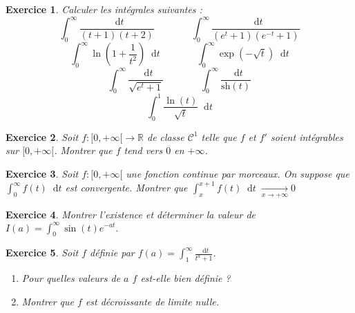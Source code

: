\documentclass[a4paper,12pt,twocolumn]{article}
\theoremstyle{break}
\theoremstyle{sc}
\newtheorem{exo}{Exercice}
\theoremstyle{definition}
\theoremstyle{remark}
\newcommand{\diff}{\mathop{}\!\mathrm{d}}
\begin{document}
\begin{exo}
  Calculer les intégrales suivantes :
  \[
    \int_0^\infty \frac{\diff
    t}{(t+1)(t+2)}\phantom{ainsi que}\int_0^\infty\frac{\diff t}{(e^t+1)(e^{-t}+1)}
  \]
  \[
    \int_0^\infty\ln(1+\frac{1}{t^2})\diff t\phantom{ainsi
    que}\int_0^\infty\exp(-\sqrt t)\diff t
  \]
  \[
    \int_0^\infty \frac{\diff t}{\sqrt{e^t+1}}\phantom{ainsi
    que}\int_0^\infty\frac{\diff t}{\mathrm{sh}(t)}
  \]
  \[
    \int_0^1\frac{\ln(t)}{\sqrt t}\diff t
  \]
\end{exo}

\begin{exo}
  Soit $f:[0,+\infty[\rightarrow\mathbb{R}$ de classe $\mathcal C^1$
    telle que $f$ et $f'$ soient intégrables sur $[0,+\infty[$. Montrer
      que $f$ tend vers $0$ en $+\infty$.
\end{exo}

\begin{exo}
  Soit $f:[0,+\infty[$ une fonction continue par morceaux. On suppose
    que $\int_0^\infty f(t)\diff t$ est convergente. Montrer que
    $\int_x^{x+1}f(t)\diff
    t\;\underset{x\rightarrow+\infty}{\longrightarrow}0$
\end{exo}

\begin{exo}
  Montrer l'existence et déterminer la valeur de
  $I(a)=\int_0^\infty\sin(t)e^{-at}.$
\end{exo}

\begin{exo}
  Soit $f$ définie par $f(a)=\int_1^\infty \frac{\diff t}{t^a+1}$.
  \begin{enumerate}
    \item Pour quelles valeurs de $a$ $f$ est-elle bien définie ?
    \item Montrer que $f$ est décroissante de limite nulle.
  \end{enumerate}
\end{exo}
\end{document}
